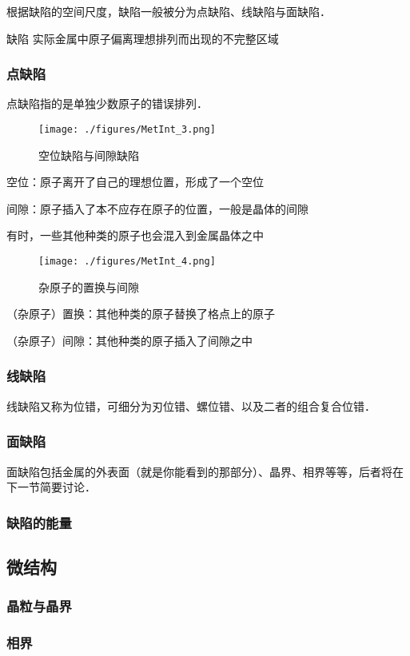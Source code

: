 根据缺陷的空间尺度，缺陷一般被分为点缺陷、线缺陷与面缺陷．

\begin{definition}{缺陷}
实际金属中原子偏离理想排列而出现的不完整区域
\end{definition}

\subsubsection{点缺陷}
点缺陷指的是单独少数原子的错误排列．
\begin{figure}[ht]
\centering
\texttt{[image: ./figures/MetInt\_3.png]}
\caption{空位缺陷与间隙缺陷} \label{MetInt_fig3}
\end{figure}
空位：原子离开了自己的理想位置，形成了一个空位

间隙：原子插入了本不应存在原子的位置，一般是晶体的间隙

有时，一些其他种类的原子也会混入到金属晶体之中
\begin{figure}[ht]
\centering
\texttt{[image: ./figures/MetInt\_4.png]}
\caption{杂原子的置换与间隙} \label{MetInt_fig4}
\end{figure}

（杂原子）置换：其他种类的原子替换了格点上的原子

（杂原子）间隙：其他种类的原子插入了间隙之中

\subsubsection{线缺陷}
线缺陷又称为位错，可细分为刃位错、螺位错、以及二者的组合复合位错．

\subsubsection{面缺陷}
面缺陷包括金属的外表面（就是你能看到的那部分）、晶界、相界等等，后者将在下一节简要讨论．

\subsubsection{缺陷的能量}

\subsection{微结构}
\subsubsection{晶粒与晶界}
\subsubsection{相界}